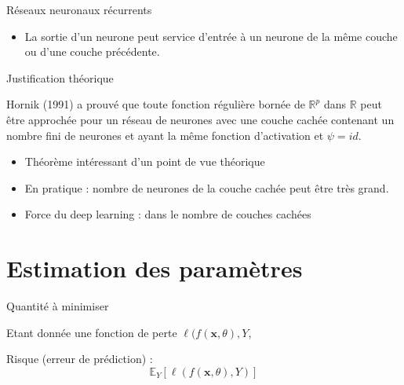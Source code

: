 \documentclass[ignorenonframetext,]{beamer}
\providecommand{\tightlist}{%
  \setlength{\itemsep}{0pt}\setlength{\parskip}{0pt}}
\begin{document}
\begin{frame}{Réseaux neuronaux récurrents}

\begin{itemize}
\tightlist
\item
  La sortie d'un neurone peut service d'entrée à un neurone de la même
  couche ou d'une couche précédente.
\end{itemize}

\end{frame}

\begin{frame}{Justification théorique}

Hornik (1991) a prouvé que toute fonction régulière bornée de
\(\mathbb{R}^p\) dans \(\mathbb{R}\) peut être approchée pour un réseau
de neurones avec une couche cachée contenant un nombre fini de neurones
et ayant la même fonction d'activation et \(\psi = id\).

\begin{itemize}
\item
  Théorème intéressant d'un point de vue théorique
\item
  En pratique : nombre de neurones de la couche cachée peut être très
  grand.
\item
  Force du deep learning : dans le nombre de couches cachées
\end{itemize}

\end{frame}

\section{Estimation des paramètres}\label{estimation-des-parametres}

\begin{frame}{Quantité à minimiser}

Etant donnée une fonction de perte \(\ell(f(\mathbf{x},\theta),Y\),

Risque (erreur de prédiction) :
\[\mathbb{E}_{Y}[\ell(f(\mathbf{x},\theta),Y)]\]

\end{frame}
\end{document}
